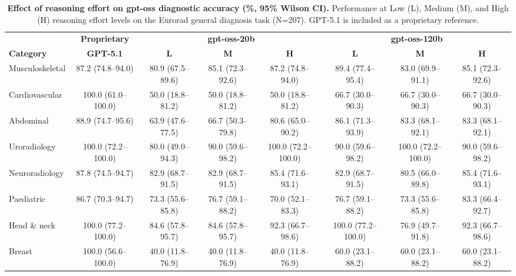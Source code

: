 \documentclass[10pt,journal,compsoc, onecolumn]{IEEEtran}
\begin{document}
\begin{table}[!htbp]
\centering
\scriptsize
\setlength{\tabcolsep}{3pt}
\caption{\textbf{Effect of reasoning effort on gpt-oss diagnostic accuracy (\%, 95\% Wilson CI).}
Performance at Low (L), Medium (M), and High (H) reasoning effort levels on the Eurorad general diagnosis task (N=207). GPT-5.1 is included as a proprietary reference.}
\label{tab:reasoning_effort}
\begin{tabular}{l c @{\hskip 6pt} ccc @{\hskip 6pt} ccc}
\toprule
& \textbf{Proprietary} & \multicolumn{3}{c}{\textbf{gpt-oss-20b}} & \multicolumn{3}{c}{\textbf{gpt-oss-120b}} \\
\cmidrule(lr){2-2} \cmidrule(lr){3-5} \cmidrule(lr){6-8}
\textbf{Category} &
\textbf{GPT-5.1} &
\textbf{L} & \textbf{M} & \textbf{H} &
\textbf{L} & \textbf{M} & \textbf{H} \\
\midrule
Musculoskeletal        & 87.2 (74.8--94.0) & 80.9 (67.5--89.6) & 85.1 (72.3--92.6) & 87.2 (74.8--94.0) & 89.4 (77.4--95.4) & 83.0 (69.9--91.1) & 85.1 (72.3--92.6) \\
Cardiovascular         & 100.0 (61.0--100.0) & 50.0 (18.8--81.2) & 50.0 (18.8--81.2) & 50.0 (18.8--81.2) & 66.7 (30.0--90.3) & 66.7 (30.0--90.3) & 66.7 (30.0--90.3) \\
Abdominal              & 88.9 (74.7--95.6) & 63.9 (47.6--77.5) & 66.7 (50.3--79.8) & 80.6 (65.0--90.2) & 86.1 (71.3--93.9) & 83.3 (68.1--92.1) & 83.3 (68.1--92.1) \\
Uroradiology           & 100.0 (72.2--100.0) & 80.0 (49.0--94.3) & 90.0 (59.6--98.2) & 100.0 (72.2--100.0) & 90.0 (59.6--98.2) & 100.0 (72.2--100.0) & 90.0 (59.6--98.2) \\
Neuroradiology         & 87.8 (74.5--94.7) & 82.9 (68.7--91.5) & 82.9 (68.7--91.5) & 85.4 (71.6--93.1) & 82.9 (68.7--91.5) & 80.5 (66.0--89.8) & 85.4 (71.6--93.1) \\
Paediatric             & 86.7 (70.3--94.7) & 73.3 (55.6--85.8) & 76.7 (59.1--88.2) & 70.0 (52.1--83.3) & 76.7 (59.1--88.2) & 73.3 (55.6--85.8) & 83.3 (66.4--92.7) \\
Head \& neck           & 100.0 (77.2--100.0) & 84.6 (57.8--95.7) & 84.6 (57.8--95.7) & 92.3 (66.7--98.6) & 100.0 (77.2--100.0) & 76.9 (49.7--91.8) & 92.3 (66.7--98.6) \\
Breast                 & 100.0 (56.6--100.0) & 40.0 (11.8--76.9) & 40.0 (11.8--76.9) & 40.0 (11.8--76.9) & 60.0 (23.1--88.2) & 60.0 (23.1--88.2) & 60.0 (23.1--88.2) \\

\end{tabular}
\end{table}
\end{document}
